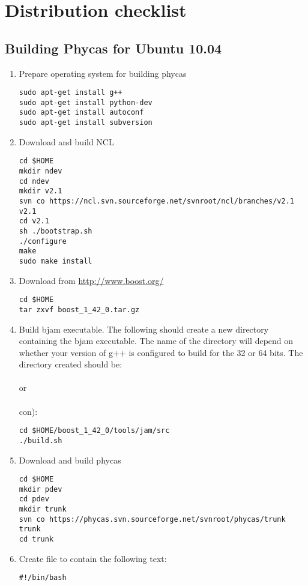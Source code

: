 \chapter{Distribution checklist} 

\section{Building Phycas for Ubuntu 10.04}

\begin{enumerate}
\item Prepare operating system for building phycas
\begin{verbatim}
sudo apt-get install g++
sudo apt-get install python-dev
sudo apt-get install autoconf
sudo apt-get install subversion
\end{verbatim}
%
\item Download and build NCL
\begin{verbatim}
cd $HOME
mkdir ndev
cd ndev
mkdir v2.1
svn co https://ncl.svn.sourceforge.net/svnroot/ncl/branches/v2.1 v2.1
cd v2.1
sh ./bootstrap.sh
./configure
make
sudo make install
\end{verbatim}
%
\item Download  from \url{http://www.boost.org/}
\begin{verbatim}
cd $HOME
tar zxvf boost_1_42_0.tar.gz
\end{verbatim}
%
\item Build bjam executable.
The following should create a new directory 
containing the bjam executable. 
The name of the directory will depend on whether your version of g++ is configured
to build for the 32 or 64 bits. 
The directory created should be:\\
\\
or \\
 \\
con):
\begin{verbatim}
cd $HOME/boost_1_42_0/tools/jam/src
./build.sh
\end{verbatim}
%
\item Download and build phycas
\begin{verbatim}
cd $HOME
mkdir pdev
cd pdev
mkdir trunk
svn co https://phycas.svn.sourceforge.net/svnroot/phycas/trunk trunk
cd trunk
\end{verbatim}
%
\item Create file  to contain the following text:
\begin{verbatim}
#!/bin/bash


\end{verbatim}
\end{enumerate}
